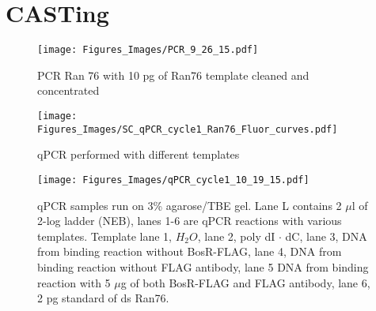 \documentclass[12pt,twoside]{reedthesis}
\begin{document}
  
  \section{CASTing} 
  
    		 \begin{figure}[h!tbp]
    		\centering
    		\texttt{[image: Figures\_Images/PCR\_9\_26\_15.pdf]}
    		\caption[PCR to Create Pool of Random DNA]{PCR Ran 76 with 10 pg of Ran76 template cleaned and concentrated}
    		\label{PCRRan76}
    	\end{figure}
 
 
 \begin{figure}[h!tbp]
 	\centering
 	\texttt{[image: Figures\_Images/SC\_qPCR\_cycle1\_Ran76\_Fluor\_curves.pdf]}
 	\caption[qPCR of 1st Cycle of CASTing Fluorescence Curves]{qPCR performed with different templates}
 	\label{qPCRcycle1fluorcurves}
 \end{figure}

 
 
      		 \begin{figure}[h!tbp]
      		\centering
      		\texttt{[image: Figures\_Images/qPCR\_cycle1\_10\_19\_15.pdf]}
      		\caption[qPCR of 1st Cycle of CASTing Gel Analysis]{qPCR samples run on 3\% agarose/TBE gel. Lane L contains 2 $\mu$l of 2-log ladder (NEB), lanes 1-6 are qPCR reactions with various templates. Template lane 1, $H_{2}O$, lane 2, poly dI $\cdot$ dC, lane 3, DNA from binding reaction without BosR-FLAG, lane 4, DNA from binding reaction without FLAG antibody, lane 5 DNA from binding reaction with 5 $\mu$g of both BosR-FLAG and FLAG antibody, lane 6, 2 pg standard of ds Ran76.}
      		\label{qPCRcycle1}
      	\end{figure}
 
\end{document}
